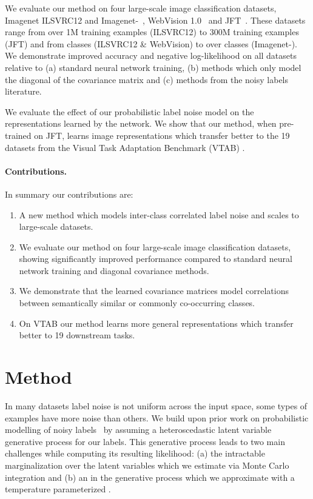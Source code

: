\documentclass[final]{cvpr}
\begin{document}
We evaluate our method on four large-scale image classification datasets, Imagenet ILSVRC12 and Imagenet-~\cite{deng2009imagenet}, WebVision 1.0~\cite{li2017webvision} and JFT~\cite{distillation2015}. These datasets range from over 1M training examples (ILSVRC12) to 300M training examples (JFT) and from  classes (ILSVRC12 \& WebVision) to over  classes (Imagenet-). We demonstrate improved accuracy and negative log-likelihood on all datasets relative to (a) standard neural network training, (b) methods which only model the diagonal of the covariance matrix and (c) methods from the noisy labels literature.

We evaluate the effect of our probabilistic label noise model on the representations learned by the network. We show that our method, when pre-trained on JFT, learns image representations which transfer better to the 19 datasets from the Visual Task Adaptation Benchmark (VTAB) \cite{zhai2020largescale}.

\paragraph{Contributions.} In summary our contributions are:
\begin{enumerate}
    \itemsep0em 
    \item A new method which models inter-class correlated label noise and scales to large-scale datasets.
    \item We evaluate our method on four large-scale image classification datasets, showing significantly improved performance compared to standard neural network training and diagonal covariance methods.
\item We demonstrate that the learned covariance matrices model correlations between semantically similar or commonly co-occurring classes.
\item On VTAB our method learns more general representations which transfer better to 19 downstream tasks.
\end{enumerate}

\section{Method}
\label{sec:method}

In many datasets label noise is not uniform across the input space, some types of examples have more noise than others. We build upon prior work on probabilistic modelling of noisy labels~\cite{kendall2017uncertainties,collier2020analysis} by assuming a heteroscedastic latent variable generative process for our labels. This generative process leads to two main challenges while computing its resulting likelihood: (a) the intractable marginalization over the latent variables which we estimate via Monte Carlo integration and (b) an  in the generative process which we approximate with a temperature parameterized .
\end{document}
